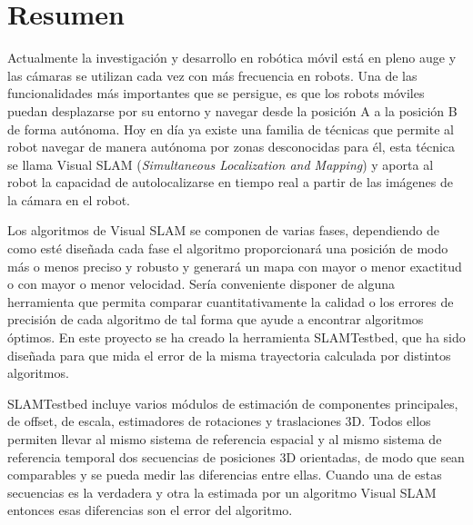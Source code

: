 \chapter*{Resumen}

Actualmente la investigación y desarrollo en robótica móvil está en pleno auge y las cámaras se utilizan cada vez con más frecuencia en robots. Una de las funcionalidades más importantes que se persigue, es que los robots móviles puedan desplazarse por su entorno y navegar desde la posición A a la posición B de forma autónoma. Hoy en día ya existe una familia de técnicas que permite al robot navegar de manera autónoma por zonas desconocidas para él, esta técnica se llama Visual SLAM (\textit{Simultaneous Localization and Mapping}) y aporta al robot la capacidad de autolocalizarse en tiempo real a partir de las imágenes de la cámara en el robot. 

Los algoritmos de Visual SLAM se componen de varias fases, dependiendo de como esté diseñada cada fase el algoritmo proporcionará una posición de modo más o menos preciso y robusto y generará un mapa con mayor o menor exactitud o con mayor o menor velocidad. Sería conveniente disponer de alguna herramienta que permita comparar cuantitativamente la calidad o los errores de precisión de cada algoritmo de tal forma que ayude a encontrar algoritmos óptimos. En este proyecto se ha creado la herramienta SLAMTestbed, que ha sido diseñada para que mida el error de la misma trayectoria calculada por distintos algoritmos.

SLAMTestbed incluye varios módulos de estimación de componentes principales, de offset, de escala, estimadores de rotaciones y traslaciones 3D. Todos ellos permiten llevar al mismo sistema de referencia espacial y al mismo sistema de referencia temporal dos secuencias de posiciones 3D orientadas, de modo que sean comparables y se pueda medir las diferencias entre ellas. Cuando una de estas secuencias es la verdadera y otra la estimada por un algoritmo Visual SLAM entonces esas diferencias son el error del algoritmo.